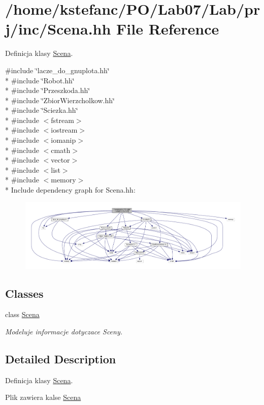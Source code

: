 \hypertarget{_scena_8hh}{\section{/home/kstefanc/\+P\+O/\+Lab07/\+Lab/prj/inc/\+Scena.hh File Reference}
\label{_scena_8hh}
}


Definicja klasy \hyperlink{class_scena}{Scena}.  


{\ttfamily \#include \char`\"{}lacze\+\_\+do\+\_\+gnuplota.\+hh\char`\"{}}\\*
{\ttfamily \#include \char`\"{}Robot.\+hh\char`\"{}}\\*
{\ttfamily \#include \char`\"{}Przeszkoda.\+hh\char`\"{}}\\*
{\ttfamily \#include \char`\"{}Zbior\+Wierzcholkow.\+hh\char`\"{}}\\*
{\ttfamily \#include \char`\"{}Sciezka.\+hh\char`\"{}}\\*
{\ttfamily \#include $<$fstream$>$}\\*
{\ttfamily \#include $<$iostream$>$}\\*
{\ttfamily \#include $<$iomanip$>$}\\*
{\ttfamily \#include $<$cmath$>$}\\*
{\ttfamily \#include $<$vector$>$}\\*
{\ttfamily \#include $<$list$>$}\\*
{\ttfamily \#include $<$memory$>$}\\*
Include dependency graph for Scena.\+hh\+:\nopagebreak
\begin{figure}[H]
\begin{center}
\leavevmode
\includegraphics[width=350pt]{_scena_8hh__incl}
\end{center}
\end{figure}
\subsection*{Classes}
\begin{DoxyCompactItemize}
\item 
class \hyperlink{class_scena}{Scena}
\begin{DoxyCompactList}\small\item\em Modeluje informacje dotyczace Sceny. \end{DoxyCompactList}\end{DoxyCompactItemize}


\subsection{Detailed Description}
Definicja klasy \hyperlink{class_scena}{Scena}. 

Plik zawiera kalse \hyperlink{class_scena}{Scena} 
